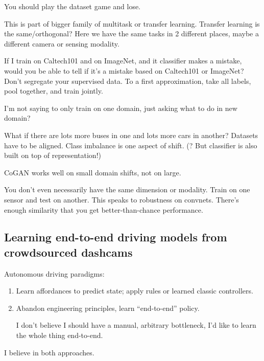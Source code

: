 You should play the dataset game and lose. 



This is part of bigger family of multitask or transfer learning. Transfer learning is the same/orthogonal? Here we have the same tasks in 2 different places, maybe a different camera or sensing modality.

If I train on Caltech101 and on ImageNet, and it classifier makes a mistake, would you be able to tell if it's a mistake based on Caltech101 or ImageNet? Don't segregate your supervised data. 
To a first approximation, take all labels, pool together, and train jointly.

I'm not saying to only train on one domain, just asking what to do in new domain?

What if there are lots more buses in one and lots more cars in another? Datasets have to be aligned.
Class imbalance is one aspect of shift. 
(? But classifier is also built on top of representation!)

CoGAN works well on small domain shifts, not on large. 

You don't even necessarily have the same dimension or modality. Train on one sensor and test on another. This speaks to robustness on convnets. 
There's enough similarity that you get better-than-chance performance. %


\subsection{Learning end-to-end driving models from crowdsourced dashcams}

Autonomous driving paradigms:
\begin{enumerate}
\item
Learn affordances to predict state; apply rules or learned classic controllers.
\item
Abandon engineering principles, learn ``end-to-end'' policy.

I don't believe I should have a manual, arbitrary bottleneck, I'd like to learn the whole thing end-to-end. 
\end{enumerate}

I believe in both approaches.

